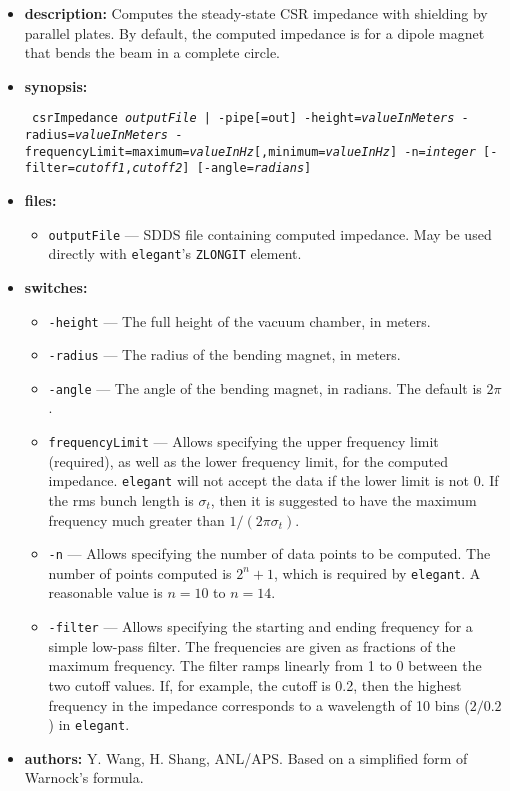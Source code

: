 \documentclass[11pt]{article}
\begin{document}
\begin{itemize}
\item {\bf description:}  Computes the steady-state CSR impedance with shielding by parallel plates.
By default, the computed impedance is for a dipole magnet that bends the beam in a complete circle.

\item {\bf synopsis:}
\begin{flushleft}{\tt
csrImpedance {{\em outputFile}  | -pipe[=out]} -height={\em valueInMeters} -radius={\em valueInMeters}
-frequencyLimit=maximum={\em valueInHz}[,minimum={\em valueInHz}] -n={\em integer} [-filter={\em cutoff1},{\em cutoff2}]
[-angle={\em radians}]
}\end{flushleft}

\item {\bf files:}
\begin{itemize}
\item {\tt outputFile} --- SDDS file containing computed impedance.  May be used directly with 
{\tt elegant}'s \verb|ZLONGIT| element.
\end{itemize}

\item {\bf switches:}
\begin{itemize}
\item {\tt -height} --- The full height of the vacuum chamber, in meters.
\item {\tt -radius} --- The radius of the bending magnet, in meters.
\item {\tt -angle} --- The angle of the bending magnet, in radians.  The default is $2\pi$.
\item {\tt frequencyLimit} --- Allows specifying the upper frequency limit (required), as well as the
 lower frequency limit, for the computed impedance.  {\tt elegant} will not accept the data if the lower
 limit is not 0.  If the rms bunch length is $\sigma_t$, then it is suggested to have the maximum frequency 
 much greater than $1/(2\pi\sigma_t)$.
\item {\tt -n} --- Allows specifying the number of data points to be computed. The number of points computed
 is $2^n+1$, which is required by {\tt elegant}.  A reasonable value is $n=10$ to $n=14$.
\item {\tt -filter} --- Allows specifying the starting and ending frequency for a simple low-pass filter.
 The frequencies are given as fractions of the maximum frequency.  The filter ramps linearly from 1 to 0
 between the two cutoff values.  If, for example, the cutoff is 0.2, then the highest frequency
 in the impedance corresponds to a wavelength of 10 bins ($2/0.2$) in {\tt elegant}.
\end{itemize}

\item {\bf authors:} Y. Wang, H. Shang, ANL/APS.
Based on a simplified form\cite{Agoh} of Warnock's \cite{Warnock} formula.
\end{itemize}
\end{document}
